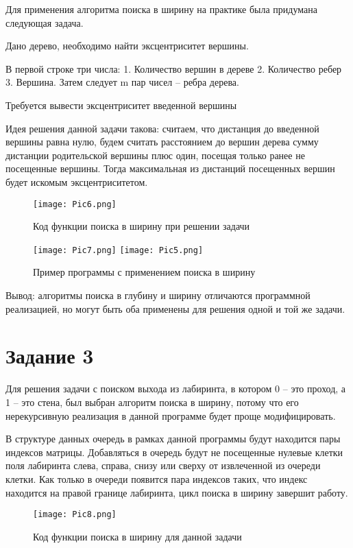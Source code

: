 \documentclass[14pt]{extreport}
\begin{document}
Для применения алгоритма поиска в ширину на практике была придумана следующая задача.

Дано дерево, необходимо найти эксцентриситет вершины.

В первой строке три числа: 1. Количество вершин в дереве 2. Количество ребер 3. Вершина.
Затем следует m пар чисел – ребра дерева.

Требуется вывести эксцентриситет введенной вершины

Идея решения данной задачи такова: считаем, что дистанция до введенной вершины равна нулю, будем считать расстоянием до вершин дерева сумму дистанции родительской вершины плюс один, посещая только ранее не посещенные вершины. Тогда максимальная из дистанций посещенных вершин будет искомым эксцентриситетом. 

\begin{figure}[H]
\centerline{\texttt{[image: Pic6.png]}}
\caption{Код функции поиска в ширину при решении задачи}
\label{fig17}
\end{figure}

\begin{figure}[H]
\texttt{[image: Pic7.png]}
\texttt{[image: Pic5.png]}
\caption{Пример программы с применением поиска в ширину}
\label{fig18}
\end{figure}

Вывод: алгоритмы поиска в глубину и ширину отличаются программной реализацией, но могут быть оба применены для решения одной и той же задачи.

\chapter{Задание 3}

Для решения задачи с поиском выхода из лабиринта, в котором 0 – это проход, а 1 – это стена, был выбран алгоритм поиска в ширину, потому что его нерекурсивную реализация в данной программе будет проще модифицировать.

В структуре данных очередь в рамках данной программы будут находится пары индексов матрицы. Добавляться в очередь будут не посещенные нулевые клетки поля лабиринта слева, справа, снизу или сверху от извлеченной из очереди клетки. Как только в очереди появится пара индексов таких, что индекс находится на правой границе лабиринта, цикл поиска в ширину завершит работу.

\begin{figure}[H]
\centerline{\texttt{[image: Pic8.png]}}
\caption{Код функции поиска в ширину для данной задачи}
\label{fig19}
\end{figure}
\end{document}
